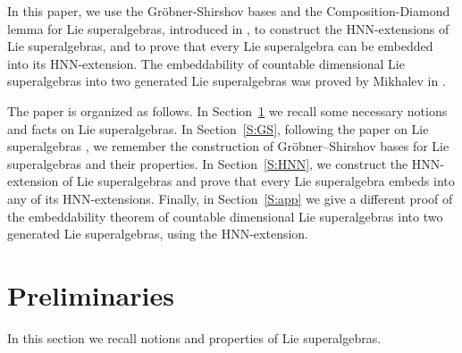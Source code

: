\documentclass[reqno]{amsart}
\theoremstyle{definition}
\theoremstyle{remark}
\numberwithin{equation}{section}
\begin{document}
In this paper, we use the Gr\"obner-Shirshov bases and the Composition-Diamond lemma for Lie superalgebras, introduced in \cite{B2}, to construct the HNN-extensions of Lie superalgebras, and to prove that every Lie superalgebra can be embedded into its HNN-extension. The embeddability of countable dimensional Lie superalgebras into two generated Lie superalgebras was proved by Mikhalev in \cite{M1}.

The paper is organized as follows. In Section~\ref{S:prel} we
recall some necessary notions and facts on Lie superalgebras.
 In Section~\ref{S:GS},  following the paper on Lie superalgebras \cite{B2},  we remember  the construction of Gr\"obner–Shirshov bases for Lie superalgebras and their properties.
In  Section~\ref{S:HNN},  we  construct the HNN-extension of Lie superalgebras and prove that every  Lie superalgebra embeds into
any of its HNN-extensions.
Finally, in  Section~\ref{S:app}  we give a different proof of the embeddability  theorem of countable dimensional Lie superalgebras into two generated Lie superalgebras, using the HNN-extension.

\section{Preliminaries}\label{S:prel}
In this section we recall notions and properties of Lie superalgebras.
\end{document}
